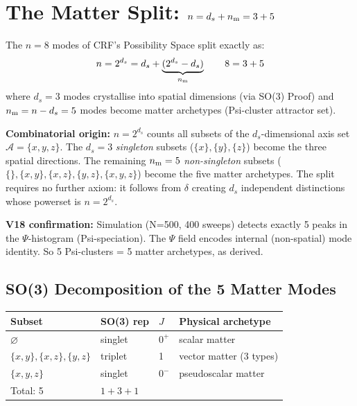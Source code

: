 \documentclass[12pt, a4paper]{article}
\begin{document}
\section{The Matter Split: $n = d_s + n_{\rm m} = 3 + 5$}

\begin{derivedbox}[title={$n = d_s + n_{\rm m} = 8 = 3 + 5$ --- Exact Powerset Origin}]
The $n=8$ modes of CRF's Possibility Space split exactly as:
\[
  n = 2^{d_s} = d_s + \underbrace{(2^{d_s}-d_s)}_{n_{\rm m}} \qquad 8 = 3 + 5
\]
where $d_s=3$ modes crystallise into spatial dimensions (via SO(3) Proof) and
$n_{\rm m} = n - d_s = 5$ modes become matter archetypes (Psi-cluster attractor set).

\textbf{Combinatorial origin:} $n = 2^{d_s}$ counts all subsets of the $d_s$-dimensional
axis set $\mathcal{A} = \{x,y,z\}$. The $d_s=3$ \emph{singleton} subsets
($\{x\},\{y\},\{z\}$) become the three spatial directions. The remaining $n_{\rm m}=5$
\emph{non-singleton} subsets ($\{\},\{x,y\},\{x,z\},\{y,z\},\{x,y,z\}$) become
the five matter archetypes. The split requires no further axiom: it follows from
$\delta$ creating $d_s$ independent distinctions whose powerset is $n=2^{d_s}$.

\textbf{V18 confirmation:} Simulation (N=500, 400 sweeps) detects exactly 5 peaks in the
$\Psi$-histogram (Psi-speciation). The $\Psi$ field encodes internal (non-spatial) mode identity.
So 5 Psi-clusters = 5 matter archetypes, as derived.
\end{derivedbox}

\subsection{SO(3) Decomposition of the 5 Matter Modes}

\begin{center}
\renewcommand{\arraystretch}{1.2}
\begin{tabular}{p{3.5cm} p{2.2cm} p{1.0cm} p{4.0cm}}
\toprule
\textbf{Subset} & \textbf{SO(3) rep} & $J$ & \textbf{Physical archetype} \\
\midrule
$\varnothing$ & singlet & $0^+$ & scalar matter \\
$\{x,y\},\{x,z\},\{y,z\}$ & triplet & 1 & vector matter (3 types) \\
$\{x,y,z\}$ & singlet & $0^-$ & pseudoscalar matter \\
\midrule
Total: 5 & $1+3+1$ & & \\
\bottomrule
\end{tabular}
\end{center}
\end{document}
